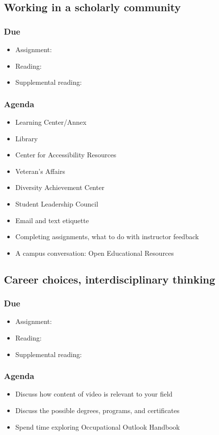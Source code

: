 \documentclass[12pt,article,oneside]{memoir}
\begin{document}
\subsection{Working in a scholarly community}
\subsubsection{Due}
\begin{itemize}
 \item Assignment: 
 \item Reading: \cite{oer,wellsley}
 \item Supplemental reading: \cite{oer-dh}
\end{itemize}


\subsubsection{Agenda}
\begin{itemize}
 \item Learning Center/Annex
 \item Library
 \item Center for Accessibility Resources
 \item Veteran's Affairs
 \item Diversity Achievement Center
 \item Student Leadership Council
 \item Email and text etiquette
 \item Completing assignments, what to do with instructor feedback
 \item A campus conversation: Open Educational Resources
\end{itemize}



\subsection{Career choices, interdisciplinary thinking}
\subsubsection{Due}
\begin{itemize}
 \item Assignment: 
 \item Reading: \cite{worksheets,ooh}
 \item Supplemental reading: \cite{gen-ed}
\end{itemize}


\subsubsection{Agenda}
\begin{itemize}
 \item Discuss how content of video is relevant to your field
 \item Discuss the possible degrees, programs, and certificates
 \item Spend time exploring Occupational Outlook Handbook
\end{itemize}
\end{document}
